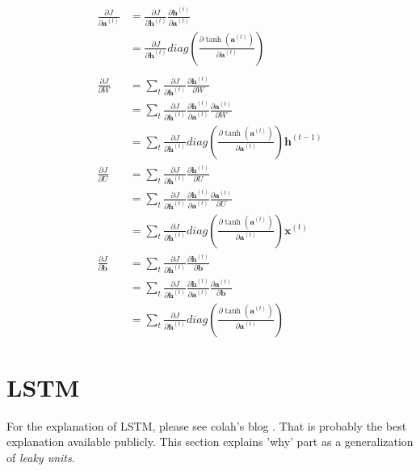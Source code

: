 \documentclass[a4]{article}
\begin{document}
\begin{equation}
\begin{aligned}
\frac{\partial J}{\partial \bm{a}^{(t)}} &=
\frac{\partial J}{\partial \bm{h}^{(t)}}
\frac{\partial \bm{h}^{(t)}}{\partial \bm{a}^{(t)}}\\
&=
\frac{\partial J}{\partial \bm{h}^{(t)}}
diag\left(\frac{\partial \tanh(\bm{a}^{(t)})}{\partial \bm{a}^{(t)}}\right)\\
\\
\frac{\partial J}{\partial W} &=
\sum_{t}
\frac{\partial J}{\partial \bm{h}^{(t)}}
\frac{\partial \bm{h}^{(t)}}{\partial W}\\
&=
\sum_{t}
\frac{\partial J}{\partial \bm{h}^{(t)}}
\frac{\partial \bm{h}^{(t)}}{\partial \bm{a}^{(t)}}
\frac{\partial \bm{a}^{(t)}}{\partial W}\\
&=
\sum_{t}
\frac{\partial J}{\partial \bm{h}^{(t)}}
diag\left(\frac{\partial \tanh(\bm{a}^{(t)})}{\partial \bm{a}^{(t)}}\right)
\bm{h}^{(t-1)}
\\
\frac{\partial J}{\partial U} &=
\sum_{t}
\frac{\partial J}{\partial \bm{h}^{(t)}}
\frac{\partial \bm{h}^{(t)}}{\partial U}\\
&=
\sum_{t}
\frac{\partial J}{\partial \bm{h}^{(t)}}
\frac{\partial \bm{h}^{(t)}}{\partial \bm{a}^{(t)}}
\frac{\partial \bm{a}^{(t)}}{\partial U}\\
&=
\sum_{t}
\frac{\partial J}{\partial \bm{h}^{(t)}}
diag\left(\frac{\partial \tanh(\bm{a}^{(t)})}{\partial \bm{a}^{(t)}}\right)
\bm{x}^{(t)}
\\
\frac{\partial J}{\partial \bm{b}} &=
\sum_{t}
\frac{\partial J}{\partial \bm{h}^{(t)}}
\frac{\partial \bm{h}^{(t)}}{\partial \bm{b}}\\
&=
\sum_{t}
\frac{\partial J}{\partial \bm{h}^{(t)}}
\frac{\partial \bm{h}^{(t)}}{\partial \bm{a}^{(t)}}
\frac{\partial \bm{a}^{(t)}}{\partial \bm{b}}\\
&=
\sum_{t}
\frac{\partial J}{\partial \bm{h}^{(t)}}
diag\left(\frac{\partial \tanh(\bm{a}^{(t)})}{\partial \bm{a}^{(t)}}\right)
\end{aligned}
\end{equation}


\section{LSTM}
For the explanation of LSTM, please see colah's blog \cite{colah}. That is probably the best explanation
available publicly.
This section explains 'why' part as a generalization of \emph{leaky units}\cite{mosar}\cite{elhihi_bengio}.
\end{document}
